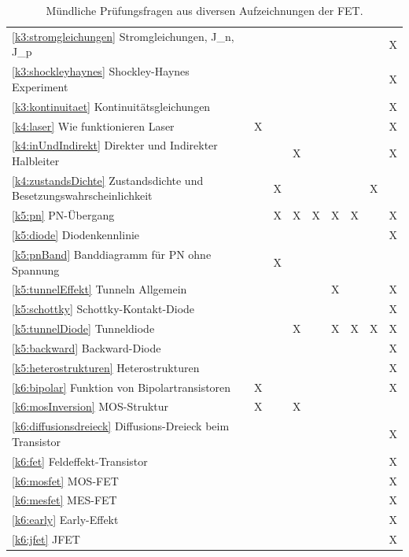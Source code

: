 \documentclass{article}
\begin{document}
\begin{center}
\begin{table}[H]
\begin{adjustbox}{width=\textwidth}
\begin{tabular}{lcccccccc}
\ref{k3:stromgleichungen} Stromgleichungen, J\_n, J\_p &&&&&&&& X \\
\ref{k3:shockleyhaynes} Shockley-Haynes Experiment &&&&&&&& X \\
\ref{k3:kontinuitaet} Kontinuit\"atsgleichungen &&&&&&&& X \\
\ref{k4:laser} Wie funktionieren Laser & X &&&&&&& X\\
\ref{k4:inUndIndirekt} Direkter und Indirekter Halbleiter&&& X &&&&& X \\
\ref{k4:zustandsDichte} Zustandsdichte und Besetzungswahrscheinlichkeit && X &&&&& X \\
\ref{k5:pn} PN-\"Ubergang && X & X & X &X&X&& X \\
\ref{k5:diode} Diodenkennlinie &&&&&&&& X \\
\ref{k5:pnBand} Banddiagramm f\"ur PN ohne Spannung  && X &&&&&& \\
\ref{k5:tunnelEffekt} Tunneln Allgemein&&&&& X &&& X\\
\ref{k5:schottky} Schottky-Kontakt-Diode &&&&&&&& X \\
\ref{k5:tunnelDiode} Tunneldiode&&& X && X & X & X & X \\
\ref{k5:backward} Backward-Diode &&&&&&&& X \\
\ref{k5:heterostrukturen} Heterostrukturen &&&&&&&& X \\
\ref{k6:bipolar} Funktion von Bipolartransistoren & X &&&&&&& X \\
\ref{k6:mosInversion} MOS-Struktur & X && X &&&&& \\
\ref{k6:diffusionsdreieck} Diffusions-Dreieck beim Transistor &&&&&&&& X \\
\ref{k6:fet} Feldeffekt-Transistor &&&&&&&& X \\
\ref{k6:mosfet} MOS-FET &&&&&&&& X \\
\ref{k6:mesfet} MES-FET &&&&&&&& X \\
\ref{k6:early} Early-Effekt &&&&&&&& X \\
\ref{k6:jfet} JFET &&&&&&&& X \\

\hline

\hline

\end{tabular}
\end{adjustbox}
\caption{Mündliche Prüfungsfragen aus diversen Aufzeichnungen der FET.}
\end{table}
\end{center}
\end{document}

